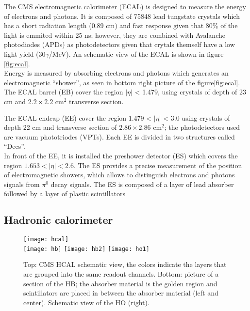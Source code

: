 \noindent The CMS electromagnetic calorimeter (ECAL) is designed to measure the energy of electrons and photons. It is composed of 75848 lead tungstate crystals which has a short radiation length (0.89 cm) and fast response given that 80\% of the light is emmited within 25 ns; however, they are combined with Avalanche photodiodes (APDs) as photodetectors given that crytals themself have a low light yield (30$\gamma$/MeV). An schematic view of the ECAL is shown in figure \ref{fig:ecal}.\\

\noindent Energy is measured by absorbing electrons and photons which generates an electromagnetic ``shower'', as seen in bottom right picture of the figure\ref{fig:ecal}. The ECAL barrel (EB) cover the region $|\eta|$ < 1.479, using crystals of depth of 23 cm and  $2.2\times 2.2$ cm$^2$ transverse section. 

\noindent The ECAL endcap (EE) cover the region 1.479 < $|\eta|$ < 3.0 using crystals of depth 22 cm and transverse section of $2.86\times2.86$ cm$^2$; the photodetectors used are vacuum phototriodes (VPTs). Each EE is divided in two structures called ``Dees''.\\

\noindent In front of the EE, it is installed the preshower detector (ES) which covers the region $1.653 < |\eta| < 2.6$. The ES provides a precise measurement of the position of electromagnetic showers, which allows to distinguish electrons and photons signals from $\pi^0$ decay signals. The ES is composed of a layer of lead absorber followed by a layer of plastic scintillators

\subsection{Hadronic calorimeter}

\begin{figure}[h!]
  \centering
  \texttt{[image: hcal]}\\
  \texttt{[image: hb]}
  \texttt{[image: hb2]}
  \texttt{[image: ho1]} 
  \caption[CMS HCAL schematic view]{Top: CMS HCAL schematic view, the colors indicate the layers that are grouped into the same readout channels. Bottom: picture of a section of the HB; the absorber material is the golden region and scintillators are placed in between the absorber material (left and center). Schematic view of the HO (right).\cite{hcal,hb} }
  \label{fig:hcal}
\end{figure}

